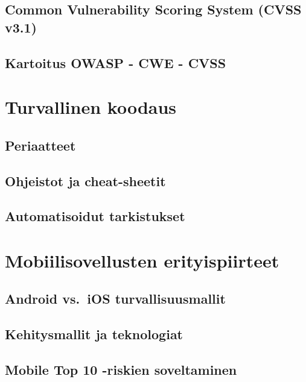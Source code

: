 \documentclass[bscthesis,finnish,oneside,biblatex]{uefcsthesis}
\begin{document}
    \subsection{Common Vulnerability Scoring System (CVSS v3.1)}

    \subsection{Kartoitus OWASP - CWE - CVSS}



    \section{Turvallinen koodaus}
    \label{sec:secure-code}

    \subsection{Periaatteet}

    \subsection{Ohjeistot ja cheat-sheetit}

    \subsection{Automatisoidut tarkistukset}



    \section{Mobiilisovellusten erityispiirteet}
    \label{sec:mobile}

    \subsection{Android vs.\ iOS turvallisuusmallit}

    \subsection{Kehitysmallit ja teknologiat}

    \subsection{Mobile Top 10 -riskien soveltaminen}
\end{document}
